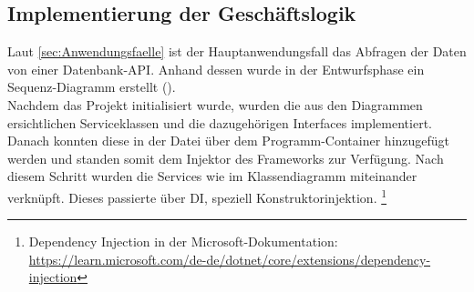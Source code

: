 \subsection{Implementierung der Geschäftslogik}
\label{sec:ImplementierungGeschaeftslogik}
Laut \ref{sec:Anwendungsfaelle}  ist der Hauptanwendungsfall
das Abfragen der Daten von einer Datenbank-\acs{API}. Anhand dessen wurde in der Entwurfsphase ein
Sequenz-Diagramm erstellt (\Vgl {}).\\
Nachdem das Projekt initialisiert wurde, wurden die aus den Diagrammen ersichtlichen Serviceklassen
und die dazugehörigen Interfaces implementiert. Danach konnten diese in der Datei 
über  dem Programm-Container hinzugefügt werden und standen somit 
dem Injektor des Frameworks zur Verfügung. Nach diesem Schritt wurden die Services wie
im Klassendiagramm  miteinander verknüpft.
Dieses passierte über \acs{DI}, speziell Konstruktorinjektion. \footnote{Dependency Injection in der Microsoft-Dokumentation:\\ 
\url{https://learn.microsoft.com/de-de/dotnet/core/extensions/dependency-injection}}\\

